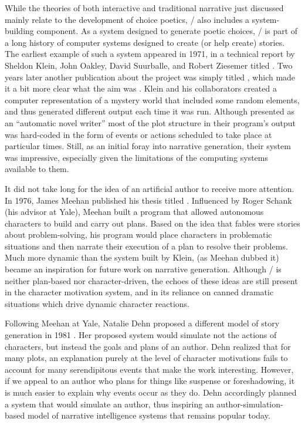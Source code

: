 While the theories of both interactive and traditional narrative just discussed mainly relate to the development of choice poetics, \dunyazad/ also includes a system-building component.
%
As a system designed to generate poetic choices, \dunyazad/ is part of a long history of computer systems designed to create (or help create) stories.
%
The earliest example of such a system appeared in 1971, in a technical report by Sheldon Klein, John Oakley, David Suurballe, and Robert Ziesemer titled  \citep{Klein1971}.
%
Two years later another publication about the project was simply titled , which made it a bit more clear what the aim was \citep{Klein1973}.
%
Klein and his collaborators created a computer representation of a mystery world that included some random elements, and thus generated different output each time it was run.
%
Although presented as an ``automatic novel writer'' most of the plot structure in their program's output was hard-coded in the form of events or actions scheduled to take place at particular times.
%
Still, as an initial foray into narrative generation, their system was impressive, especially given the limitations of the computing systems available to them.


It did not take long for the idea of an artificial author to receive more attention.
%
In 1976, James Meehan published his thesis titled  \citep{Meehan1976}.
%
Influenced by Roger Schank (his advisor at Yale), Meehan built a program that allowed autonomous characters to build and carry out plans.
%
Based on the idea that fables were stories about problem-solving, his program would place characters in problematic situations and then narrate their execution of a plan to resolve their problems.
%
Much more dynamic than the system built by Klein,  (as Meehan dubbed it) became an inspiration for future work on narrative generation.
%
Although \dunyazad/ is neither plan-based nor character-driven, the echoes of these ideas are still present in the character motivation system, and in its reliance on canned dramatic situations which drive dynamic character reactions.


Following Meehan at Yale, Natalie Dehn proposed a different model of story generation in 1981 \citep{Dehn1981}.
%
Her proposed system  would simulate not the actions of characters, but instead the goals and plans of an author.
%
Dehn realized that for many plots, an explanation purely at the level of character motivations fails to account for many serendipitous events that make the work interesting.
%
However, if we appeal to an author who plans for things like suspense or foreshadowing, it is much easier to explain why events occur as they do.
%
Dehn accordingly planned a system that would simulate an author, thus inspiring an author-simulation-based model of narrative intelligence systems that remains popular today.


